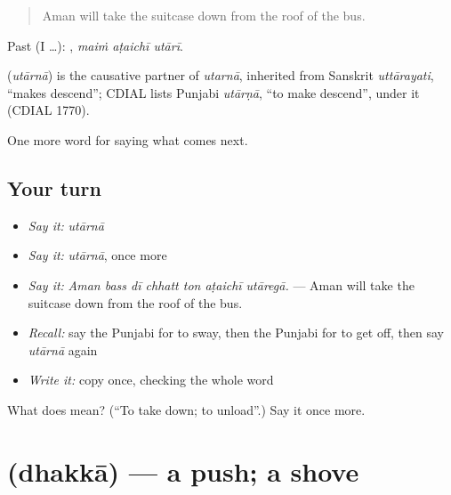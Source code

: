\begin{quote}
Aman will take the suitcase down from the roof of the bus.
\end{quote}

Past (I …):   , \emph{maiṁ aṭaichī utārī}.

\begin{cousinweb}
\textbf{} (\emph{utārnā}) is the causative partner of \emph{utarnā}, inherited from Sanskrit \emph{uttārayati}, \textquotedblleft{}makes descend\textquotedblright{}; CDIAL lists Punjabi \emph{utārṇā}, \textquotedblleft{}to make descend\textquotedblright{}, under it (CDIAL 1770).
\end{cousinweb}

\begin{grammarlens}[title={What you've built}]
One more word for saying what comes next.
\end{grammarlens}

\subsection*{Your turn}
\begin{itemize}
\raggedright
  \item \emph{Say it:} \emph{utārnā}
  \item \emph{Say it:} \emph{utārnā}, once more
  \item \emph{Say it:} \emph{Aman bass dī chhatt ton aṭaichī utāregā.} — Aman will take the suitcase down from the roof of the bus.
  \item \emph{Recall:} say the Punjabi for to sway, then the Punjabi for to get off, then say \emph{utārnā} again
  \item \emph{Write it:} copy \textbf{} once, checking the whole word
\end{itemize}

\begin{tcolorbox}[breakable,colback=teal!4,colframe=teal!35!black,title={Before you move on}]
What does  mean? (\textquotedblleft{}To take down; to unload\textquotedblright{}.) Say it once more.
\end{tcolorbox}
\section[\texorpdfstring{\pa{ਧੱਕਾ} (dhakkā)}{ਧੱਕਾ (dhakkā)}]{ (dhakkā) — a push; a shove}

\label{lesson:PA-C284-dhakka}



